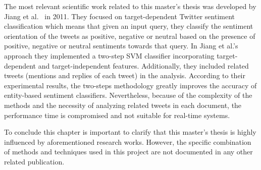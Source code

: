 The most relevant scientific work related to this master's thesis was developed by Jiang et al.~\cite{jiang2011target} in 2011. They focused on target-dependent Twitter sentiment
classification which means that given an input query, they classify the sentiment orientation of the tweets as positive, negative or neutral based on the presence of positive, negative or neutral sentiments towards that query. In Jiang et al.'s approach they implemented a two-step SVM classifier incorporating
target-dependent and target-independent features. Additionally, they included related tweets (mentions and replies of each tweet) in the analysis. According to their experimental results, the two-steps methodology greatly improves the accuracy of entity-based sentiment classifiers. Nevertheless, because of the complexity of the methods and the necessity of analyzing related tweets in each document, the performance time is compromised and not suitable for real-time systems.

To conclude this chapter is important to clarify that this master's thesis is highly influenced by aforementioned research works. However, the specific combination of methods and techniques used in this project are not documented in any other related publication.   

